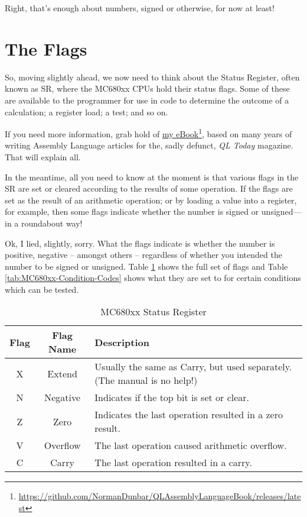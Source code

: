 Right, that's enough about numbers, signed or otherwise, for now at
least!

\section{The Flags}

So, moving slightly ahead, we now need to think about the Status Register,
often known as SR, where the MC680xx CPUs hold their status flags.
Some of these are available to the programmer for use in code to determine
the outcome of a calculation; a register load; a test; and so on.

If you need more information, grab hold of \href{https://github.com/NormanDunbar/QLAssemblyLanguageBook/releases/latest}{my eBook}\footnote{\url{https://github.com/NormanDunbar/QLAssemblyLanguageBook/releases/latest}},
based on many years of writing Assembly Language articles for the,
sadly defunct, \emph{QL Today} magazine. That will explain all.

In the meantime, all you need to know at the moment is that various
flags in the SR are set or cleared according to the results of some
operation. If the flags are set as the result of an arithmetic operation;
or by loading a value into a register, for example, then some flags
indicate whether the number is signed or unsigned---in a roundabout
way!

Ok, I lied, slightly, sorry. What the flags indicate is whether the
number is positive, negative -- amongst others -- regardless of
whether you intended the number to be signed or unsigned. Table \ref{tab:MC680xx-Status-Register}
shows the full set of flags and Table \ref{tab:MC680xx-Condition-Codes}
shows what they are set to for certain conditions which can be tested.

\begin{table}[!h]
\begin{centering}
\begin{tabular}{|c|c|>{\raggedright}p{}|}
\hline 
\textbf{Flag} & \textbf{Flag Name} & \textbf{Description}\tabularnewline
\hline 
\hline 
X & Extend & Usually the same as Carry, but used separately. (The manual is no
help!)\tabularnewline
\hline 
N & Negative & Indicates if the top bit is set or clear.\tabularnewline
\hline 
Z & Zero & Indicates the last operation resulted in a zero result.\tabularnewline
\hline 
V & Overflow & The last operation caused arithmetic overflow.\tabularnewline
\hline 
C & Carry & The last operation resulted in a carry.\tabularnewline
\hline 
\end{tabular}
\par\end{centering}
\caption{MC680xx Status Register\label{tab:MC680xx-Status-Register}}
\end{table}


